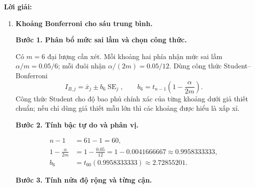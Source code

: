 \documentclass[11pt,a4paper]{article}
\newenvironment{solution}{%
  \par\medskip\noindent\textbf{Lời giải:}\par\nobreak\smallskip\noindent\ignorespaces
}{\par}
\newcommand{\answer}[1]{\boxed{#1}}
\newcommand{\step}[2]{\par\medskip\noindent\textbf{Bước #1. #2}\par\nopagebreak[4]\smallskip\noindent}
\begin{document}
\begin{solution}
\begin{enumerate}[label=\textbf{\alph*)}]
\begin{align*}
D_{14}&=3266.46\cdot474.98-(1175.50)^2\\
&=1551503.1708-1381800.2500=169702.9208.
\end{align*}
Do đó
\[
\mathbf{S}_{14}^{-1}=\frac1{169702.9208}
\begin{pmatrix}474.98&-1175.50\\-1175.50&3266.46\end{pmatrix}.
\]
Tính từng hệ số:
\begin{align*}
a&=474.98/169702.9208\approx0.002798891,\\
b&=-1175.50/169702.9208\approx-0.006926811,\\
c&=3266.46/169702.9208\approx0.019248107.
\end{align*}
\step{4}{Khai triển dạng toàn phương và kết luận.}
Tính trước $\mathbf{S}_{14}^{-1}(u,v)'=(au+bv,bu+cv)'$.
Nhân tiếp với $(u,v)$:
\begin{align*}
(u,v)\mathbf{S}_{14}^{-1}(u,v)'
&=u(au+bv)+v(bu+cv)\\
&=au^2+2buv+cv^2.
\end{align*}
Vì $2b\approx-0.013853621$, miền cần tìm có biểu thức số xấp xỉ
\[
\answer{61\left(0.002798891u^2-0.013853621uv
+0.019248107v^2\right)\le5.99146455}.
\]
Ellipse có tâm $(95.52,93.39)'$, nghiêng theo hướng tương quan dương
vì $s_{14}>0$.
Ở đây dùng 2 bậc tự do vì xét riêng cặp biến. Nếu chiếu miền sáu chiều
ở câu (a) xuống mặt phẳng này, cùng dạng toàn phương sẽ có ngưỡng
$c_6\approx12.59158724$; ellipse chiếu đó lớn hơn và giữ bảo đảm đồng thời
của bài toán sáu chiều.
\item \textbf{Khoảng Bonferroni cho sáu trung bình.}\par\nopagebreak[4]
\step{1}{Phân bổ mức sai lầm và chọn công thức.}
Có $m=6$ đại lượng cần xét. Mỗi khoảng hai phía nhận mức sai lầm
$\alpha/m=0.05/6$; mỗi đuôi nhận $\alpha/(2m)=0.05/12$.
Dùng công thức Student--Bonferroni
\[
I_{B,j}=\bar{x}_j\pm b_6\operatorname{SE}_j,\qquad
b_6=t_{n-1}\left(1-\frac{\alpha}{2m}\right).
\]
Công thức Student cho độ bao phủ chính xác của từng khoảng dưới giả thiết
chuẩn; nếu chỉ dùng giả thiết mẫu lớn thì các khoảng được hiểu là xấp xỉ.
\step{2}{Tính bậc tự do và phân vị.}
\begin{align*}
n-1&=61-1=60,\\
1-\frac{\alpha}{2m}&=1-\frac{0.05}{12}
=1-0.0041666667\approx0.9958333333,\\
b_6&=t_{60}(0.9958333333)\approx2.72855201.
\end{align*}
\step{3}{Tính nửa độ rộng và từng cận.}

\end{enumerate}
\end{solution}
\end{document}
